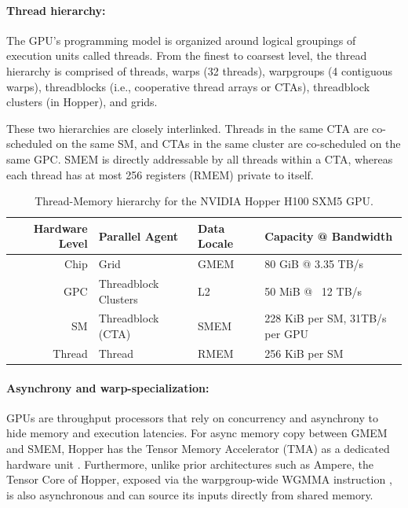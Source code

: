 \documentclass{article}
\begin{document}
\paragraph{Thread hierarchy:} The GPU's programming model is organized around logical groupings of execution units called threads.
From the finest to coarsest level, the thread hierarchy is comprised of threads, warps (32 threads), warpgroups (4 contiguous warps), threadblocks (i.e., cooperative thread arrays or CTAs), threadblock clusters (in Hopper), and grids.

These two hierarchies are closely interlinked.
Threads in the same CTA are co-scheduled on the same SM, and CTAs in the same cluster are co-scheduled on the same GPC.
SMEM is directly addressable by all threads within a CTA, whereas each thread has at most 256 registers (RMEM) private to itself.




\begin{table}[h!]
  \small
  \centering
  \caption{Thread-Memory hierarchy for the NVIDIA Hopper H100 SXM5 GPU.}
  \label{tab:gpu-hierarchy}
  \begin{tabular}{|r|l|l|l|}
      \hline
      \textbf{Hardware Level} & \textbf{Parallel Agent} & \textbf{Data Locale} & \textbf{Capacity @ Bandwidth} \\
      \hline
      Chip   & Grid                 & GMEM & 80  GiB @ 3.35 TB/s \\
      GPC    & Threadblock Clusters & L2   & 50  MiB @ ~12 TB/s \\
      SM     & Threadblock (CTA)    & SMEM & 228 KiB per SM, 31TB/s per GPU \\
      Thread & Thread               & RMEM & 256 KiB per SM \\
      \hline
  \end{tabular}
\end{table}



\paragraph{Asynchrony and warp-specialization:}

GPUs are throughput processors that rely on concurrency and asynchrony to hide memory and execution latencies.
For async memory copy between GMEM and SMEM, Hopper has the Tensor Memory Accelerator (TMA) as a dedicated hardware unit \cite[\S7.29]{cuda}.
Furthermore, unlike prior architectures such as Ampere, the Tensor Core of Hopper, exposed via the warpgroup-wide WGMMA instruction \cite[\S9.7.14]{ptx}, is also asynchronous and can source its inputs directly from shared memory.
\end{document}

